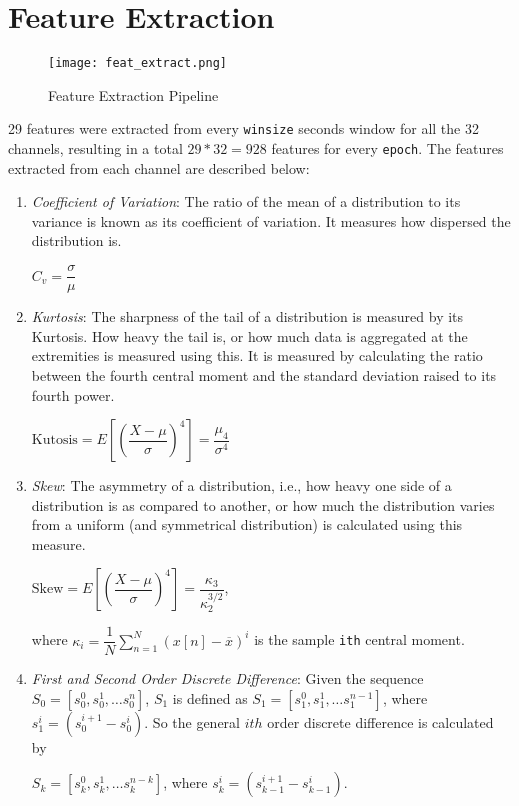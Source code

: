 \section{Feature Extraction}
\label{sec:featureExtraction}

\begin{figure}[H]
\centering
\texttt{[image: feat\_extract.png]}
\caption{Feature Extraction Pipeline}
\label{fig-5-3}
\end{figure}

29 features were extracted from every \texttt{winsize} seconds window for all the 32 channels, resulting in a total $29 * 32 = 928$ features for every \texttt{epoch}. The features extracted from each channel are described below:
\begin{enumerate}

\item \emph{Coefficient of Variation}: The ratio of the mean of a distribution to its variance is known as its coefficient of variation. It measures how dispersed the distribution is.
\begin{tightcenter}
$C_{v}=\dfrac {\sigma }{\mu }$
\end{tightcenter}

\item \emph{Kurtosis}: The sharpness of the tail of a distribution is measured by its Kurtosis. How heavy the tail is, or how much data is aggregated at the extremities is measured using this. It is measured by calculating the ratio between the fourth central moment and the standard deviation raised to its fourth power.
\begin{tightcenter}
$\text{Kutosis} = E\left[ \left( \dfrac {X-\mu }{\sigma }\right) ^{4}\right]
 = \dfrac{\mu_4}{\sigma^4}$
\end{tightcenter}

\item \emph{Skew}: The asymmetry of a distribution, i.e., how heavy one side of a distribution is as compared to another, or how much the distribution varies from a uniform (and symmetrical distribution) is calculated using this measure.
\begin{tightcenter}
$\text{Skew} = {E\left[ \left( \dfrac {X-\mu }{\sigma }\right) ^{4}\right]} = {\dfrac {\kappa_{3}}{\kappa_{2}^{3/2}}}$,
\end{tightcenter}
where ${\kappa_i = \dfrac {1}{N}\sum ^{N}_{n=1}\left( x\left[ n\right] -\overline {x}\right) ^{i}}$ is the sample \texttt{ith} central moment.

\item \emph{First and Second Order Discrete Difference}: Given the sequence ${S_0 = [s_0^0, s_0^1, \ldots s_0^n]}$, ${S_1}$ is defined as ${S_1 = [s_1^0, s_1^1, \ldots s_1^{n-1}]}$, where $s_1^i = (s_0^{i + 1} - s_0^i)$. So the general $ith$ order discrete difference is calculated by
\begin{tightcenter}
$S_k = [s_k^0, s_k^1, \ldots s_k^{n - k}]$, where $s_k^i = (s_{k-1}^{i + 1} - s_{k - 1}^i)$.
\end{tightcenter}


\end{enumerate}
